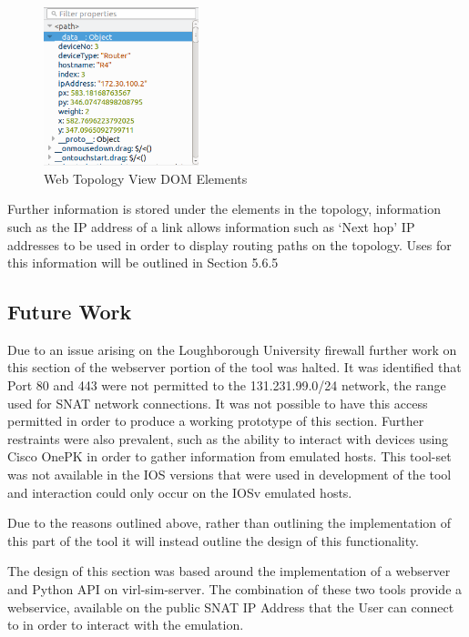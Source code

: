 \documentclass[11pt]{report}
\begin{document}
\begin{figure}[!]
	\caption{Web Topology View DOM Elements}
	\centering
	\includegraphics[width=0.4\textwidth]{topologyWebDOM.png}
\end{figure}

Further information is stored under the elements in the topology, information such as the IP address of a link allows information such as `Next hop' IP addresses to be used in order to display routing paths on the topology. Uses for this information will be outlined in Section 5.6.5



\subsection{Future Work}

Due to an issue arising on the Loughborough University firewall further work on this section of the webserver portion of the tool was halted. It was identified that Port 80 and 443 were not permitted to the 131.231.99.0/24 network, the range used for SNAT network connections. It was not possible to have this access permitted in order to produce a working prototype of this section. Further restraints were also prevalent, such as the ability to interact with devices using Cisco OnePK in order to gather information from emulated hosts. This tool-set was not available in the IOS versions that were used in development of the tool and interaction could only occur on the IOSv emulated hosts.

Due to the reasons outlined above, rather than outlining the implementation of this part of the tool it will instead outline the design of this functionality.

The design of this section was based around the implementation of a webserver and Python API on virl-sim-server. The combination of these two tools provide a webservice, available on the public SNAT IP Address that the User can connect to in order to interact with the emulation.
\end{document}
